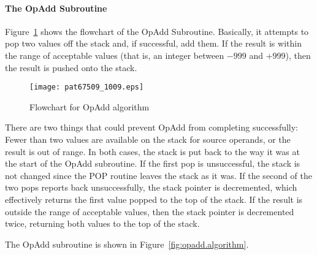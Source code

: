 \documentclass{patt}
\begin{document}
\paragraph{The OpAdd Subroutine}

Figure~\ref{fig:opadd.flowchart} shows the flowchart of the OpAdd
Subroutine. Basically, it attempts to pop two values off the
stack and, if successful, add them. If the result is within the range
of acceptable values (that is, an integer between $-999$ and $+999$),
then the result is pushed onto the stack.

\begin{figure}[h!]
\centerline{\texttt{[image: pat67509\_1009.eps]}}
\caption{Flowchart for OpAdd algorithm}
\label{fig:opadd.flowchart}
\end{figure}

\FloatBarrier
There are two things that could prevent OpAdd from
completing successfully: Fewer than two values are available on the
stack for source operands, or the result is out of range. In both
cases, the stack is put back to the way it was at the start of the
OpAdd subroutine.  If the first pop is unsuccessful,
the stack is not changed since the POP routine leaves the stack as it
was. If the second of the two pops reports back unsuccessfully, the
stack pointer is decremented, which effectively returns the first
value popped to the top of the stack. If the result is outside the
range of acceptable values, then the stack pointer is decremented
twice, returning both values to the top of the stack.

The OpAdd subroutine is shown in Figure~\ref{fig:opadd.algorithm}.
\end{document}
